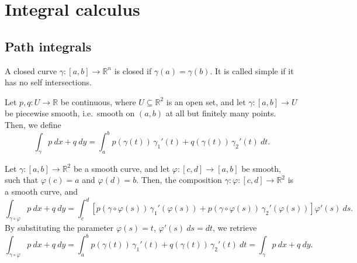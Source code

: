 \documentclass[11pt]{article}
\newcommand{\R}{\mathbb{R}}
\theoremstyle{definition}
\theoremstyle{remark}
\numberwithin{equation}{section}
\begin{document}
    \section{Integral calculus}
    
    \subsection{Path integrals}
    
    \begin{definition}
        A closed curve $\gamma\colon [a, b] \to \R^n$ is closed if $\gamma(a) =
        \gamma(b)$. It is called simple if it has no self intersections.
    \end{definition}
    
    \begin{definition}
        Let $p, q\colon U \to \R$ be continuous, where $U \subseteq \R^2$ is an open
        set, and let $\gamma \colon [a, b] \to U$ be piecewise smooth, i.e.\ smooth
        on $(a, b)$ at all but finitely many points. Then, we define \[
            \int_\gamma p\:dx + q\:dy = \int_a^b p(\gamma(t))\,\gamma_1'(t) +
            q(\gamma(t)) \,\gamma_2'(t) \:dt.
        \] 
    \end{definition}

    \begin{lemma}
        Let $\gamma\colon [a, b] \to \R^2$ be a smooth curve, and let $\varphi\colon
        [c, d] \to [a, b]$ be smooth, such that $\varphi(c) = a$ and $\varphi(d) =
        b$. Then, the composition $\gamma\colon \varphi\colon [c, d] \to \R^2$ is a
        smooth curve, and \[
            \int_{\gamma\circ \varphi} p\:dx + q\:dy = \int_c^d \left[p(\gamma\circ
            \varphi(s))\, \gamma_1'(\varphi(s)) + p(\gamma\circ
            \varphi(s))\, \gamma_2'(\varphi(s))\right] \varphi'(s) \:ds.
        \] By substituting the parameter $\varphi(s) = t$, $\varphi'(s)\:ds = dt$, we
        retrieve \[
            \int_{\gamma\circ \varphi} p\:dx + q\:dy = \int_a^b
            p(\gamma(t))\,\gamma_1'(t) + q(\gamma(t)) \,\gamma_2'(t) \:dt =
            \int_\gamma p\:dx + q\:dy.
        \]
    \end{lemma}
\end{document}
